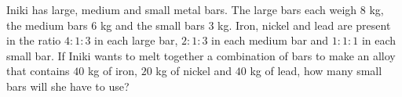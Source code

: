 Iniki has large, medium and small metal bars. The large bars each weigh $8$ kg, the medium bars $6$ kg and the small bars $3$ kg. Iron, nickel and lead are present in the ratio $4:1:3$ in each large bar, $2:1:3$ in each medium bar and $1:1:1$ in each small bar. If Iniki wants to melt together a combination of bars to make an alloy that contains $40$ kg of iron, $20$ kg of nickel and $40$ kg of lead, how many small bars will she have to use?
